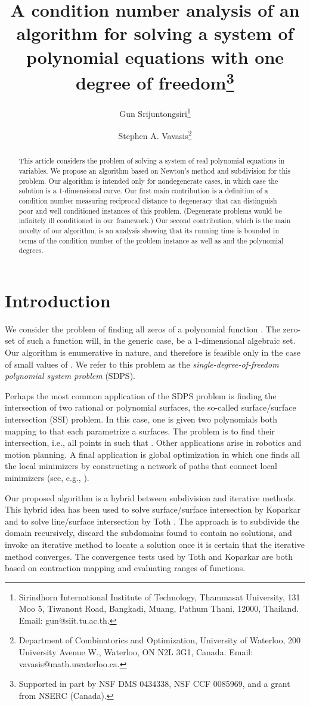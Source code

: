 \documentclass{article}
\title{A condition number analysis of an algorithm for solving a system of polynomial equations with one degree of freedom\thanks{Supported in part by
NSF DMS 0434338, NSF CCF 0085969, and a grant from NSERC
(Canada).}}
\author{Gun Srijuntongsiri\thanks{Sirindhorn International Institute of Technology, Thammasat University, 131 Moo 5, Tiwanont Road, Bangkadi,
Muang, Pathum Thani, 12000, Thailand. Email: gun@siit.tu.ac.th.} \and Stephen A. Vavasis\thanks{Department of Combinatorics and Optimization,
University of Waterloo, 200 University Avenue W., Waterloo, ON N2L
3G1, Canada. Email: vavasis@math.uwaterloo.ca.}}
\begin{document}
\maketitle

\begin{abstract}
This article considers the problem of solving a 
system of  real polynomial equations in  variables.  We propose an algorithm
based on Newton's
method and subdivision for this problem.  Our algorithm is intended only for
nondegenerate cases, in which case the solution is a 1-dimensional curve.
Our first main contribution is a definition of a condition number 
measuring reciprocal distance to degeneracy
that can distinguish poor and well conditioned instances of this problem.  
(Degenerate problems would be infinitely
ill conditioned in our framework.)
Our second contribution, which is the main
novelty of our algorithm, is an analysis showing that its running
time is bounded in terms of the condition number of the
problem instance as well as  and the polynomial degrees.  
\end{abstract}

\section{Introduction}
We consider the problem of finding all zeros of a polynomial function
.  The zero-set of such a function will, in
the generic case, be a 1-dimensional algebraic set.  Our algorithm is
enumerative in nature, and therefore is feasible only in the case of small
values of . 
We refer to this problem as the {\em single-degree-of-freedom polynomial 
system problem} (SDPS).

Perhaps the most common application of the SDPS problem is finding the intersection
of two rational or polynomial surfaces, the so-called surface/surface intersection
(SSI) problem.  In this case, one is given two polynomials  both mapping
 to  that each parametrize a surfaces.  
The problem is to find their intersection,
i.e., all points  in  such that .
Other applications arise in robotics and motion planning.  A final application
is global optimization in which one finds all the local minimizers by constructing
a network of paths that connect local minimizers (see, e.g., \cite{Leary}).


Our proposed algorithm is a hybrid between subdivision and iterative
methods.  This hybrid idea has been used to solve surface/surface
intersection by Koparkar \cite{koparkar} and to solve line/surface
intersection by Toth \cite{toth}.  The approach is to subdivide the
domain recursively, discard the subdomains found to contain no
solutions, and invoke an iterative method to locate a solution once it
is certain that the iterative method converges.  The convergence tests
used by Toth and Koparkar are both based on contraction mapping and
evaluating ranges of functions.
\end{document}
